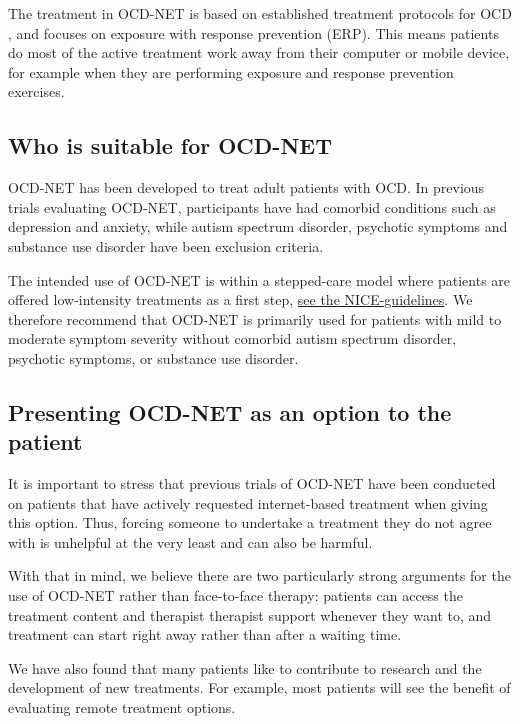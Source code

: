 \documentclass[]{book}
\theoremstyle{definition}
\theoremstyle{definition}
\theoremstyle{definition}
\theoremstyle{remark}
\begin{document}
The treatment in OCD-NET is based on established treatment protocols for
OCD \citep{foa2012}, and focuses on exposure with response prevention
(ERP). This means patients do most of the active treatment work away
from their computer or mobile device, for example when they are
performing exposure and response prevention exercises.

\hypertarget{who-is-suitable-for-ocd-net}{%
\subsection{Who is suitable for
OCD-NET}\label{who-is-suitable-for-ocd-net}}

OCD-NET has been developed to treat adult patients with OCD. In previous
trials evaluating OCD-NET, participants have had comorbid conditions
such as depression and anxiety, while autism spectrum disorder,
psychotic symptoms and substance use disorder have been exclusion
criteria.

The intended use of OCD-NET is within a stepped-care model where
patients are offered low-intensity treatments as a first step,
\href{https://www.nice.org.uk/guidance/CG31/chapter/1-Guidance\#stepped-care-for-adults-young-people-and-children-with-ocd-or-bdd}{see
the NICE-guidelines}. We therefore recommend that OCD-NET is primarily
used for patients with mild to moderate symptom severity without
comorbid autism spectrum disorder, psychotic symptoms, or substance use
disorder.

\hypertarget{presenting-ocd-net-as-an-option-to-the-patient}{%
\subsection{Presenting OCD-NET as an option to the
patient}\label{presenting-ocd-net-as-an-option-to-the-patient}}

It is important to stress that previous trials of OCD-NET have been
conducted on patients that have actively requested internet-based
treatment when giving this option. Thus, forcing someone to undertake a
treatment they do not agree with is unhelpful at the very least and can
also be harmful.

With that in mind, we believe there are two particularly strong
arguments for the use of OCD-NET rather than face-to-face therapy:
patients can access the treatment content and therapist therapist
support whenever they want to, and treatment can start right away rather
than after a waiting time.

We have also found that many patients like to contribute to research and
the development of new treatments. For example, most patients will see
the benefit of evaluating remote treatment options.
\end{document}

